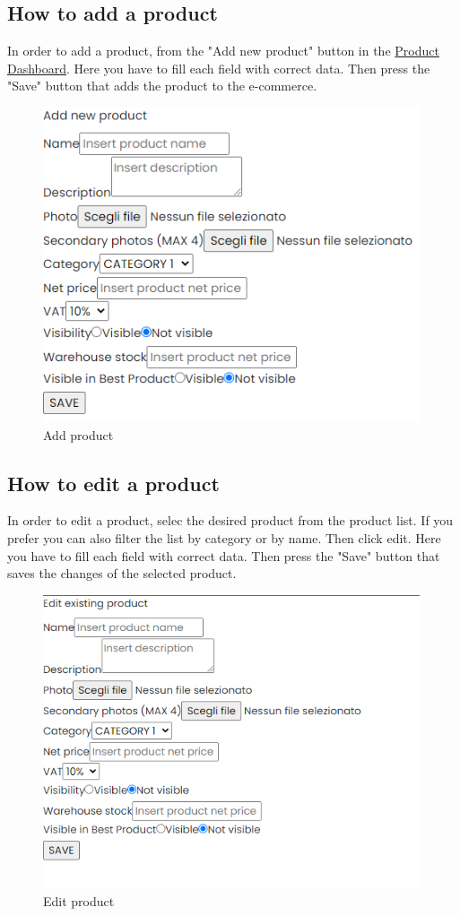 \subsection{How to add a product}
In order to add a product, from the "Add new product" button in the \hyperref[_productmanagement]{Product Dashboard}.
Here you have to fill each field with correct data. Then press the "Save" button that adds the product to the e-commerce.
\begin{figure}[H]
    \centering
    \includegraphics[width=30em]{res/images/venditore/addproduct.png}
    \caption{Add product}
\end{figure}

\subsection{How to edit a product}
In order to edit a product, selec the desired product from the product list. If you prefer you can also filter the list by category or by name. Then click edit.
Here you have to fill each field with correct data. Then press the "Save" button that saves the changes of the selected product.
\begin{figure}[H]
    \centering
    \includegraphics[width=30em]{res/images/venditore/editproduct.png}
    \caption{Edit product}
\end{figure}

